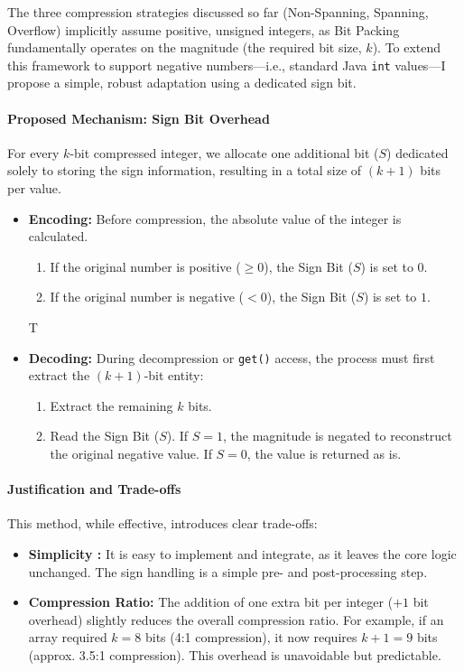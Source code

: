 \documentclass[11pt, a4paper]{article}
\begin{document}
	The three compression strategies discussed so far (Non-Spanning, Spanning, Overflow) implicitly assume positive, unsigned integers, as Bit Packing fundamentally operates on the magnitude (the required bit size, $k$). To extend this framework to support negative numbers—i.e., standard Java \texttt{int} values—I propose a simple, robust adaptation using a dedicated sign bit.
	
	\paragraph{Proposed Mechanism: Sign Bit Overhead}
	For every $k$-bit compressed integer, we allocate one additional bit ($S$) dedicated solely to storing the sign information, resulting in a total size of $(k+1)$ bits per value.
	
	\begin{itemize}
		\item \textbf{Encoding:} Before compression, the absolute value of the integer is calculated.
		\begin{enumerate}
			\item If the original number is positive ($\ge 0$), the Sign Bit ($S$) is set to $0$.
			\item If the original number is negative ($< 0$), the Sign Bit ($S$) is set to $1$.
		\end{enumerate}
		T
		
		\item \textbf{Decoding:} During decompression or \texttt{get()} access, the process must first extract the $(k+1)$-bit entity:
		\begin{enumerate}
			\item Extract the remaining $k$ bits.
			\item Read the Sign Bit ($S$). If $S=1$, the magnitude is negated to reconstruct the original negative value. If $S=0$, the value is returned as is.
		\end{enumerate}
	\end{itemize}
	
	\paragraph{Justification and Trade-offs}
	
	This method, while effective, introduces clear trade-offs:
	
	\begin{itemize}
		\item \textbf{Simplicity :} It is easy to implement and integrate, as it leaves the  core logic unchanged. The sign handling is a simple pre- and post-processing step.
		
		\item \textbf{Compression Ratio:} The addition of one extra bit per integer ($+1$ bit overhead) slightly reduces the overall compression ratio. For example, if an array required $k=8$ bits (4:1 compression), it now requires $k+1=9$ bits (approx. 3.5:1 compression). This overhead is unavoidable but predictable.
	
	\end{itemize}
	
\end{document}
